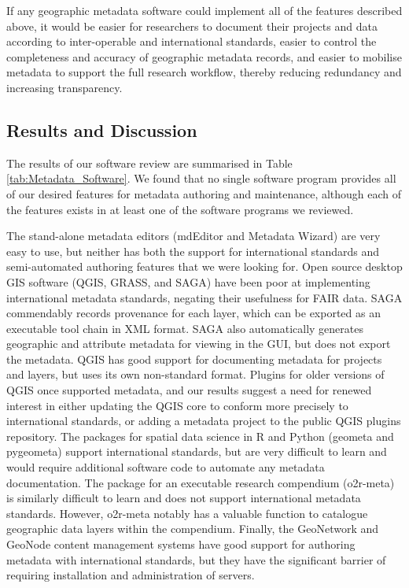 \documentclass{isprs} %
\begin{document}
If any geographic metadata software could implement all of the features described above, it would be easier for researchers to document their projects and data according to inter-operable and international standards, easier to control the completeness and accuracy of geographic metadata records, and easier to mobilise metadata to support the full research workflow, thereby reducing redundancy and increasing transparency.

\subsection{Results and Discussion}

The results of our software review are summarised in Table \ref{tab:Metadata_Software}.
We found that no single software program provides all of our desired features for metadata authoring and maintenance, although each of the features exists in at least one of the software programs we reviewed.

The stand-alone metadata editors (mdEditor and Metadata Wizard) are very easy to use, but neither has both the support for international standards and semi-automated authoring features that we were looking for.
Open source desktop GIS software (QGIS, GRASS, and SAGA) have been poor at implementing international metadata standards, negating their usefulness for FAIR data.
SAGA commendably records provenance for each layer, which can be exported as an executable tool chain in XML format.
SAGA also automatically generates geographic and attribute metadata for viewing in the GUI, but does not export the metadata.
QGIS has good support for documenting metadata for projects and layers, but uses its own non-standard format.
Plugins for older versions of QGIS once supported metadata, and our results suggest a need for renewed interest in either updating the QGIS core to conform more precisely to international standards, or adding a metadata project to the public QGIS plugins repository.
The packages for spatial data science in R and Python (geometa and pygeometa) support international standards, but are very difficult to learn and would require additional software code to automate any metadata documentation.
The package for an executable research compendium (o2r-meta) is similarly difficult to learn and does not support international metadata standards.
However, o2r-meta notably has a valuable function to catalogue geographic data layers within the compendium.
Finally, the GeoNetwork and GeoNode content management systems have good support for authoring metadata with international standards, but they have the significant barrier of requiring installation and administration of servers.
\end{document}
